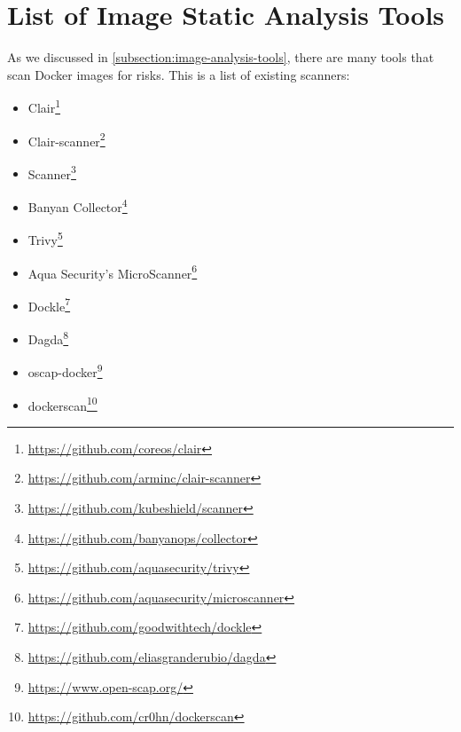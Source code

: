 \chapter{List of Image Static Analysis Tools}\label{appendix:static-analysis-list}
As we discussed in \autoref{subsection:image-analysis-tools}, there are many tools that scan Docker images for risks. This is a list of existing scanners:
\begin{itemize}
    \item Clair\footnote{\url{https://github.com/coreos/clair}}
    \item Clair-scanner\footnote{\url{https://github.com/arminc/clair-scanner}}
    \item Scanner\footnote{\url{https://github.com/kubeshield/scanner}}
    \item Banyan Collector\footnote{\url{https://github.com/banyanops/collector}}
    \item Trivy\footnote{\url{https://github.com/aquasecurity/trivy}}
    \item Aqua Security's MicroScanner\footnote{\url{https://github.com/aquasecurity/microscanner}}
    \item Dockle\footnote{\url{https://github.com/goodwithtech/dockle}}
    \item Dagda\footnote{\url{https://github.com/eliasgranderubio/dagda}}
    \item oscap-docker\footnote{\url{https://www.open-scap.org/}}
    \item dockerscan\footnote{\url{https://github.com/cr0hn/dockerscan}}
\end{itemize}
